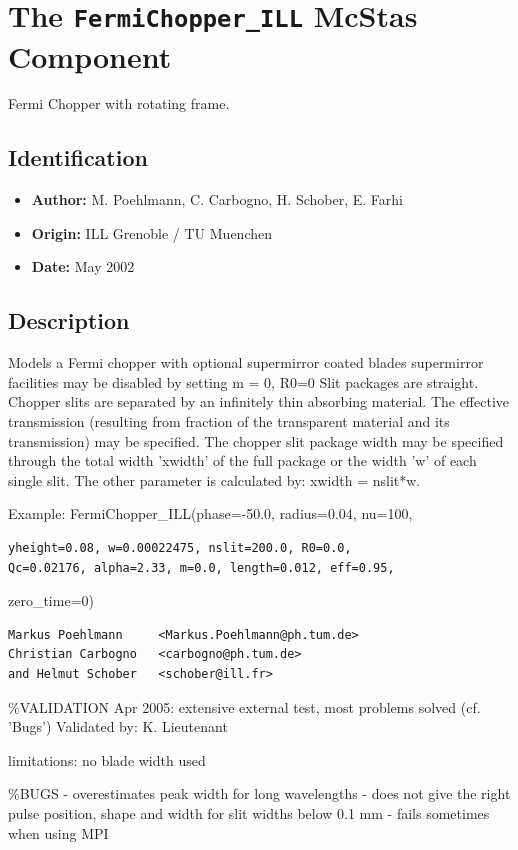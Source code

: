 \section{The \texttt{FermiChopper\_ILL} McStas Component}
Fermi Chopper with rotating frame.

\subsection*{Identification}
\begin{itemize}
  \item \textbf{Author:} M. Poehlmann, C. Carbogno, H. Schober, E. Farhi
  \item \textbf{Origin:} ILL Grenoble / TU Muenchen
  \item \textbf{Date:} May 2002
\end{itemize}

\subsection*{Description}
Models a Fermi chopper with optional supermirror coated blades supermirror facilities may be disabled by setting m = 0, R0=0 Slit packages are straight. Chopper slits are separated by an infinitely thin absorbing material. The effective transmission (resulting from fraction of the transparent material and its transmission) may be specified. The chopper slit package width may be specified through the total width 'xwidth' of the full package or the width 'w' of each single slit. The other parameter is calculated by: xwidth = nslit*w.

Example: FermiChopper\_ILL(phase=-50.0, radius=0.04, nu=100,

\begin{verbatim}
yheight=0.08, w=0.00022475, nslit=200.0, R0=0.0,
Qc=0.02176, alpha=2.33, m=0.0, length=0.012, eff=0.95,
\end{verbatim}

zero\_time=0)

\begin{verbatim}
Markus Poehlmann     <Markus.Poehlmann@ph.tum.de>
Christian Carbogno   <carbogno@ph.tum.de>
and Helmut Schober   <schober@ill.fr>
\end{verbatim}

\%VALIDATION Apr 2005: extensive external test, most problems solved (cf. 'Bugs') Validated by: K. Lieutenant

limitations: no blade width used

\%BUGS - overestimates peak width for long wavelengths - does not give the right pulse position, shape and width for slit widths below 0.1 mm - fails sometimes when using MPI

